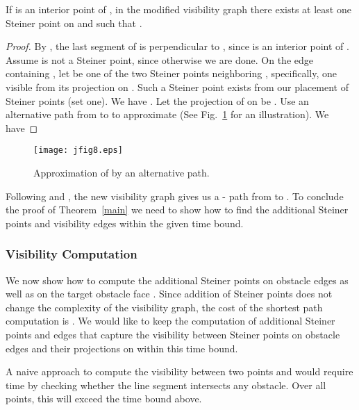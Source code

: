\documentclass{llncs}
\begin{document}
\begin{lemma}
\label{lemma-interior}
If  is an interior point of , in the modified visibility graph there exists at least one Steiner
point  on  and such that .
\end{lemma}

\begin{proof}



By , the last segment  of  is perpendicular to , since  is an interior
point of . Assume  is not a Steiner point, since otherwise we are done.
On the edge containing , let  be one of the two Steiner points neighboring ,
specifically, one visible from its projection on . Such a Steiner point exists from our placement of Steiner points (set one). We have .
Let the projection of  on  be . Use an alternative path from  to  to approximate  (See Fig.~\ref{jfig8} for an illustration). We have




\hfill 
\end{proof}

\begin{figure}\begin{center}
    \leavevmode
\texttt{[image: jfig8.eps]}
    \caption{Approximation of  by an alternative path.}
    \label{jfig8}
    \end{center}
\end{figure}


Following  and , the new visibility graph gives us a
- path from  to .
To conclude the proof of Theorem~\ref{main} we need to show how to find the additional Steiner points
and visibility edges within the given time bound.

\subsubsection{Visibility Computation}

We now show how to compute the additional Steiner points on obstacle edges as well as on the target obstacle face . Since addition of Steiner points does not change the complexity of the visibility graph, the cost of the shortest path computation is .
We would like to keep the computation of additional Steiner points and edges that capture
the visibility between Steiner points on obstacle edges and their projections on  within this time bound.

A naive approach to compute the visibility between two points  and 
would require  time by checking whether the line segment  intersects any obstacle.
Over all points, this will exceed the time bound above.
\end{document}

